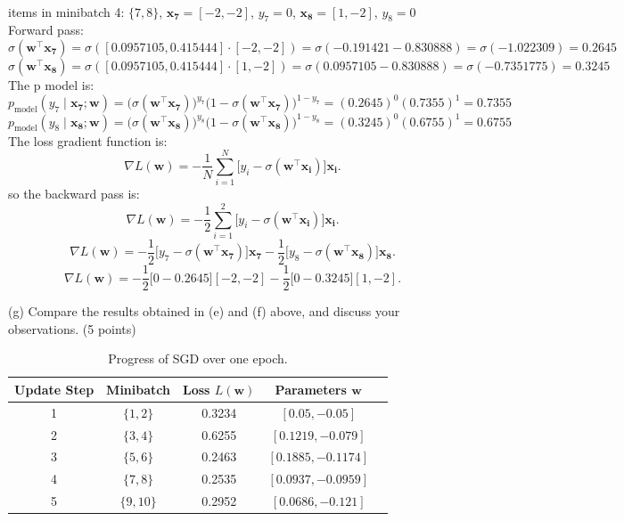 \documentclass[a3paper,12pt]{article} %
\begin{document}
\\ items in minibatch 4: \(\{7, 8\}\), \(\mathbf{x_7} = [-2, -2]\), \(y_7 = 0\), \(\mathbf{x_8} = [1, -2]\), \(y_8 = 0\)
\\ Forward pass:
\[
\sigma(\mathbf{w}^\top \mathbf{x_7}) = \sigma([0.0957105, 0.415444] \cdot [-2, -2]) = \sigma(-0.191421 - 0.830888) = \sigma(-1.022309) = 0.2645
\]
\[
\sigma(\mathbf{w}^\top \mathbf{x_8}) = \sigma([0.0957105, 0.415444] \cdot [1, -2]) = \sigma(0.0957105 - 0.830888) = \sigma(-0.7351775) = 0.3245
\]
The p model is:
\[
p_{\text{model}}(y_7 \mid \mathbf{x_7}; \mathbf{w}) = \big(\sigma(\mathbf{w}^\top \mathbf{x_7})\big)^{y_7} \big(1 - \sigma(\mathbf{w}^\top \mathbf{x_7})\big)^{1-y_7} = (0.2645)^0 (0.7355)^1 = 0.7355
\]
\[
p_{\text{model}}(y_8 \mid \mathbf{x_8}; \mathbf{w}) = \big(\sigma(\mathbf{w}^\top \mathbf{x_8})\big)^{y_8} \big(1 - \sigma(\mathbf{w}^\top \mathbf{x_8})\big)^{1-y_8} = (0.3245)^0 (0.6755)^1 = 0.6755
\]
The loss gradient function is:
\[
\nabla L(\mathbf{w}) = -\frac{1}{N} \sum^N_{i=1} \big[y_i - \sigma(\mathbf{w}^\top \mathbf{x_i})\big] \mathbf{x_i}.
\]
so the backward pass is:
\[
\nabla L(\mathbf{w}) = -\frac{1}{2} \sum^2_{i=1} \big[y_i - \sigma(\mathbf{w}^\top \mathbf{x_i})\big] \mathbf{x_i}.
\]
\[
\nabla L(\mathbf{w}) = -\frac{1}{2} \big[y_7 - \sigma(\mathbf{w}^\top \mathbf{x_7})\big] \mathbf{x_7} - \frac{1}{2} \big[y_8 - \sigma(\mathbf{w}^\top \mathbf{x_8})\big] \mathbf{x_8}.
\]
\[
\nabla L(\mathbf{w}) = -\frac{1}{2} \big[0 - 0.2645\big] [-2, -2] - \frac{1}{2} \big[0 - 0.3245\big] [1, -2].
\]

(g)
Compare the results obtained in (e) and (f) above, and discuss your observations.
\hfill (5 points)

\begin{table}[h!]
\centering
\begin{tabular}{|c|c|c|c|c|}
\hline
\textbf{Update Step} & \textbf{Minibatch} & \textbf{Loss $L(\mathbf{w})$} & \textbf{Parameters $\mathbf{w}$} \\ \hline
1 & $\{1, 2\}$ & 0.3234 & $[0.05, -0.05]$ \\ \hline
2 & $\{3, 4\}$ & 0.6255 & $[0.1219, -0.079]$ \\ \hline
3 & $\{5, 6\}$ & 0.2463 & $[0.1885, -0.1174]$ \\ \hline
4 & $\{7, 8\}$ & 0.2535 & $[0.0937, -0.0959]$ \\ \hline
5 & $\{9, 10\}$ & 0.2952 & $[0.0686, -0.121]$ \\ \hline
\end{tabular}
\caption{Progress of SGD over one epoch.}
\label{tab:table2}
\end{table}
\end{document}
